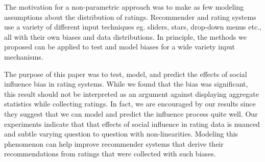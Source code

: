 The motivation for a non-parametric approach was to make as few modeling assumptions about the distribution of ratings.
Recommender and rating systems use a variety of different input techniques eg. sliders, stars, drop-down menus etc., all with their own biases and data distributions.
In principle, the methods we proposed can be applied to test and model biases for a wide variety input mechanisms.

The purpose of this paper was to test, model, and predict the effects of social influence bias in rating systems.
While we found that the bias was significant, this result should not be interpreted as an argument against displaying aggregate statistics while collecting ratings.
In fact, we are encouraged by our results since they suggest that we can model and predict the influence process quite well.
Our experiments indicate that that effects of social influence in rating data is nuanced and subtle varying question to question with non-linearities.
Modeling this phenomenon can help improve recommender systems that derive their recommendations from ratings that were collected with such biases.
